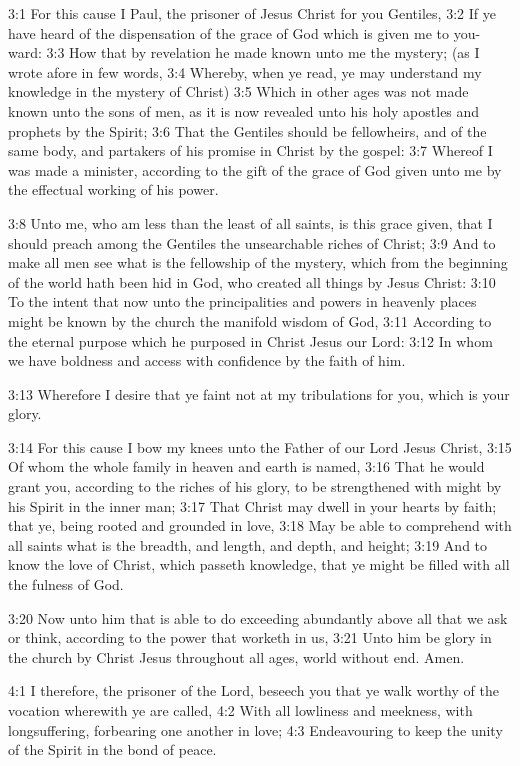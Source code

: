 3:1 For this cause I Paul, the prisoner of Jesus Christ for you Gentiles, 3:2 If ye have heard of the dispensation of the grace of God which is given me to you-ward: 3:3 How that by revelation he made known unto me the mystery; (as I wrote afore in few words, 3:4 Whereby, when ye read, ye may understand my knowledge in the mystery of Christ) 3:5 Which in other ages was not made known unto the sons of men, as it is now revealed unto his holy apostles and prophets by the Spirit; 3:6 That the Gentiles should be fellowheirs, and of the same body, and partakers of his promise in Christ by the gospel: 3:7 Whereof I was made a minister, according to the gift of the grace of God given unto me by the effectual working of his power.

3:8 Unto me, who am less than the least of all saints, is this grace given, that I should preach among the Gentiles the unsearchable riches of Christ; 3:9 And to make all men see what is the fellowship of the mystery, which from the beginning of the world hath been hid in God, who created all things by Jesus Christ: 3:10 To the intent that now unto the principalities and powers in heavenly places might be known by the church the manifold wisdom of God, 3:11 According to the eternal purpose which he purposed in Christ Jesus our Lord: 3:12 In whom we have boldness and access with confidence by the faith of him.

3:13 Wherefore I desire that ye faint not at my tribulations for you, which is your glory.

3:14 For this cause I bow my knees unto the Father of our Lord Jesus Christ, 3:15 Of whom the whole family in heaven and earth is named, 3:16 That he would grant you, according to the riches of his glory, to be strengthened with might by his Spirit in the inner man; 3:17 That Christ may dwell in your hearts by faith; that ye, being rooted and grounded in love, 3:18 May be able to comprehend with all saints what is the breadth, and length, and depth, and height; 3:19 And to know the love of Christ, which passeth knowledge, that ye might be filled with all the fulness of God.

3:20 Now unto him that is able to do exceeding abundantly above all that we ask or think, according to the power that worketh in us, 3:21 Unto him be glory in the church by Christ Jesus throughout all ages, world without end. Amen.

4:1 I therefore, the prisoner of the Lord, beseech you that ye walk worthy of the vocation wherewith ye are called, 4:2 With all lowliness and meekness, with longsuffering, forbearing one another in love; 4:3 Endeavouring to keep the unity of the Spirit in the bond of peace.

